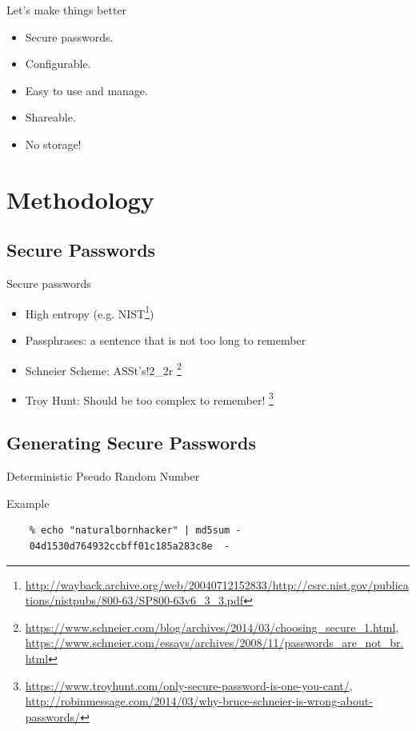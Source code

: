 \documentclass{beamer}
\begin{document}
\begin{frame}{Let's make things better}
  \begin{itemize}
    \item Secure passwords.
    \item Configurable.
    \item Easy to use and manage.
    \item Shareable.
    \item {\color{red} No storage!}
  \end{itemize}
\end{frame}


\section{Methodology}
\subsection{Secure Passwords}
\begin{frame}{Secure passwords}
  \begin{itemize}
    \item High entropy (e.g. NIST\footnote{\url{http://wayback.archive.org/web/20040712152833/http://csrc.nist.gov/publications/nistpubs/800-63/SP800-63v6_3_3.pdf}})
    \item Passphrases: a sentence that is not too long to remember
    \item Schneier Scheme: ASSt's!2\_2r \footnote{\url{https://www.schneier.com/blog/archives/2014/03/choosing_secure_1.html}, \url{https://www.schneier.com/essays/archives/2008/11/passwords_are_not_br.html}}
    \item Troy Hunt: Should be too complex to remember! \footnote{\url{https://www.troyhunt.com/only-secure-password-is-one-you-cant/}, \url{http://robinmessage.com/2014/03/why-bruce-schneier-is-wrong-about-passwords/}}
  \end{itemize}
\end{frame}


\subsection{Generating Secure Passwords}
\begin{frame}[fragile]{Deterministic Pseudo Random Number}
  \begin{block}{Example}
    \begin{verbatim}
    % echo "naturalbornhacker" | md5sum -
    04d1530d764932ccbff01c185a283c8e  -
    \end{verbatim}
  \end{block}
\end{frame}
\end{document}
